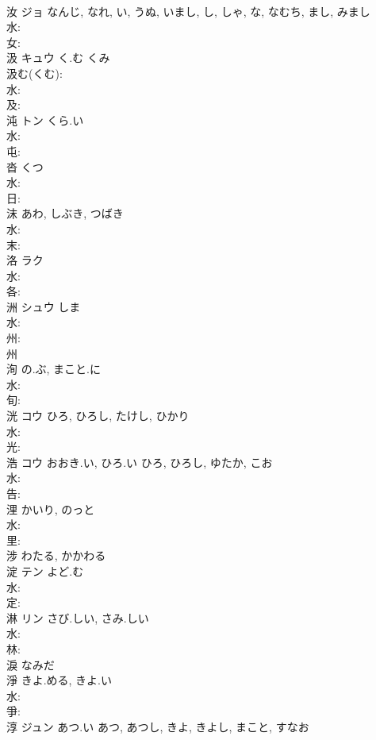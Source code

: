 \documentclass[8pt]{extreport}
\begin{document}
\begin{CJK}{UTF8}{min}
\\	汝	ジョ	なんじ, なれ, い, うぬ, いまし, し, しゃ, な, なむち, まし, みまし		
\\	水: 
\\	女: 
\\	汲	キュウ	く.む	くみ	
\\	汲む(くむ): 
\\	水: 
\\	及: 
\\	沌	トン	くら.い		
\\	水: 
\\	屯: 
\\	沓		くつ				
\\	水: 
\\	日: 
\\	沫		あわ, しぶき, つばき				
\\	水: 
\\	末: 
\\	洛	ラク			
\\	水: 
\\	各: 
\\	洲	シュウ	しま		
\\	水: 
\\	州: 
\\	州 
\\	洵		の.ぶ, まこと.に				
\\	水: 
\\	旬: 
\\	洸	コウ		ひろ, ひろし, たけし, ひかり	
\\	水: 
\\	光: 
\\	浩	コウ	おおき.い, ひろ.い	ひろ, ひろし, ゆたか, こお	
\\	水: 
\\	告: 
\\	浬		かいり, のっと				
\\	水: 
\\	里: 
\\	涉		わたる, かかわる				
\\	淀	テン	よど.む		
\\	水: 
\\	定: 
\\	淋	リン	さび.しい, さみ.しい		
\\	水: 
\\	林: 
\\	淚		なみだ				
\\	淨		きよ.める, きよ.い				
\\	水: 
\\	爭: 
\\	淳	ジュン	あつ.い	あつ, あつし, きよ, きよし, まこと, すなお	

\end{CJK}
\end{document}
